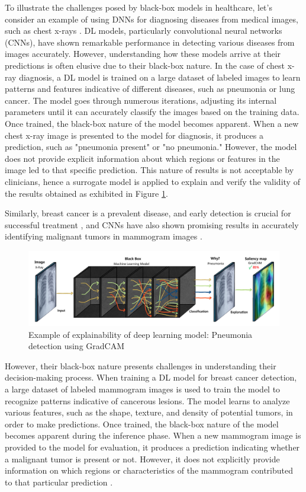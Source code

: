 \documentclass{article}
\begin{document}
To illustrate the challenges posed by black-box models in healthcare, let's consider an example of using DNNs for diagnosing diseases from medical images, such as chest x-rays \cite{ren2021interpretable}. DL models, particularly convolutional neural networks (CNNs), have shown remarkable performance in detecting various diseases from images accurately. However, understanding how these models arrive at their predictions is often elusive due to their black-box nature. In the case of chest x-ray diagnosis, a DL model is trained on a large dataset of labeled images to learn patterns and features indicative of different diseases, such as pneumonia \cite{ali2023pneumonia} or lung cancer. The model goes through numerous iterations, adjusting its internal parameters until it can accurately classify the images based on the training data. Once trained, the black-box nature of the model becomes apparent. When a new chest x-ray image is presented to the model for diagnosis, it produces a prediction, such as "pneumonia present" or "no pneumonia." However, the model does not provide explicit information about which regions or features in the image led to that specific prediction. This nature of results is not acceptable by clinicians, hence a surrogate model is applied to explain and verify the validity of the results obtained as exhibited in Figure \ref{fig:1.10}.

Similarly, breast cancer is a prevalent disease, and early detection is crucial for successful treatment \cite{shah2022artificial}, and CNNs have also shown promising results in accurately identifying malignant tumors in mammogram images \cite{sajid2023breast}.

\begin{figure}
\centering
\includegraphics[width=1\linewidth]{LXAI.jpg}
\caption{\label{fig:1.10}Example of explainability of deep learning model: Pneumonia detection using GradCAM}
\end{figure}


However, their black-box nature presents challenges in understanding their decision-making process. When training a DL model for breast cancer detection, a large dataset of labeled mammogram images is used to train the model to recognize patterns indicative of cancerous lesions. The model learns to analyze various features, such as the shape, texture, and density of potential tumors, in order to make predictions. Once trained, the black-box nature of the model becomes apparent during the inference phase. When a new mammogram image is provided to the model for evaluation, it produces a prediction indicating whether a malignant tumor is present or not. However, it does not explicitly provide information on which regions or characteristics of the mammogram contributed to that particular prediction \cite{karatza2021interpretability}. 
\end{document}
